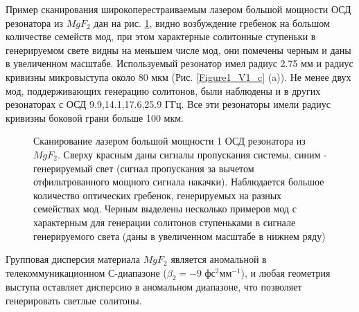 Пример сканирования широкоперестраиваемым лазером большой мощности ОСД резонатора из $MgF_2$ дан на рис. \ref{Scan_SolitonSpot}, видно возбуждение гребенок на большом количестве семейств мод, при этом характерные солитонные ступеньки в генерируемом свете видны на меньшем числе мод, они помечены черным и даны в увеличенном масштабе. Используемый резонатор имел радиус  2.75 мм и радиус кривизны микровыступа около 80 мкм (Рис. \ref{Figure1_V1_c} (a)). Не менее двух мод, поддерживающих генерацию солитонов, были наблюдены и в других резонаторах с ОСД 9.9,14.1,17.6,25.9 ГГц. Все эти резонаторы имели радиус кривизны боковой грани больше 100 мкм.

\begin{figure}[ht]
\begin{minipage}[ht]{1\linewidth}
\end{minipage}
\caption{Сканирование лазером большой мощности 1 ОСД резонатора из $MgF_2$. Сверху красным даны сигналы пропускания системы, синим - генерируемый свет (сигнал пропускания за вычетом отфильтрованного мощного сигнала накачки). Наблюдается большое количество оптических гребенок, генерируемых на разных семействах мод. Черным выделены несколько примеров мод с характерным для генерации солитонов ступеньками в сигнале генерируемого света (даны в увеличенном масштабе в нижнем ряду)}
\label{Scan_SolitonSpot}
\end{figure}

Групповая дисперсия материала $MgF_2$ является аномальной в телекоммуникационном С-диапазоне ($\beta_2=-9$ фс$^2$мм$^{-1}$), и любая геометрия выступа оставляет дисперсию в аномальном диапазоне, что позволяет генерировать светлые солитоны.

